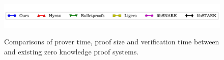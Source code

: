 \begin{figure}[htbp]
{%
}%
%
\quad
\centering
\includegraphics[width = 6.5in]{legend.pdf}
\caption{\label{fig:Allcom}Comparisons of prover time, proof size and verification time between \name{} and existing zero knowledge proof systems.}
\end{figure}

